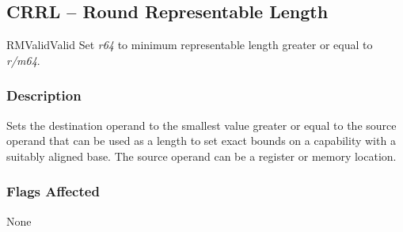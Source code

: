 \clearpage
{}
{}
\subsection*{CRRL -- Round Representable Length}

\begin{x86opcodetable}
  {RM}{Valid}{Valid}
  {Set \emph{r64} to minimum representable length greater or equal to
    \emph{r/m64}.}
\end{x86opcodetable}

\begin{x86opentable}
\end{x86opentable}

\subsubsection*{Description}

Sets the destination operand to the smallest value greater or equal to
the source operand that can be used as a length to set exact bounds on
a capability with a suitably aligned base.  The source operand can be
a register or memory location.

\subsubsection*{Flags Affected}

None
